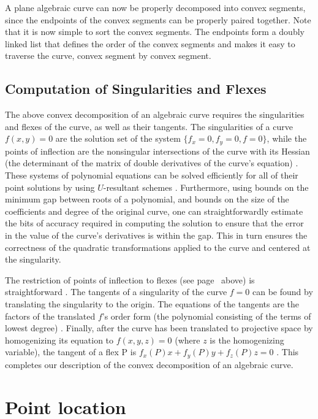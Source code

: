 A plane algebraic curve can now be properly decomposed into convex segments,
since the endpoints of the convex segments can be properly paired together.
Note that it is now simple to sort the convex segments.
The endpoints form a doubly linked list
that defines the order of the convex segments
and makes it easy to traverse the curve, convex segment by convex segment.

\subsection{Computation of Singularities and Flexes}
\label{ssc}

The above convex decomposition of an algebraic curve requires the singularities 
and flexes of the curve, as well as their tangents.
The singularities of a curve $f(x,y)=0$ are the solution set of the system
$\{f_{x}=0,f_{y}=0,f=0\}$, while the points of inflection are the nonsingular 
intersections of the curve with its Hessian (the determinant 
of the matrix of double derivatives of the curve's equation) \cite{walker}.
%
These systems of polynomial equations can be solved efficiently 
for all of their point solutions by using $U$-resultant schemes \cite[p. 74]{Ca}. 
Furthermore, using bounds on the minimum gap between roots of a polynomial, 
and bounds on the
size of the coefficients and degree of the original curve, one can straightforwardly
estimate the bits of accuracy required in computing the solution 
to ensure that the error in the value of the curve's derivatives is within the gap. 
This in turn ensures the correctness of the quadratic transformations applied to the 
curve and centered at the singularity.

The restriction of points of inflection to flexes (see page~\pageref{restriction} above)
is straightforward \cite[p. 44]{jj}.
The tangents of a singularity of the curve $f=0$ can be found by translating 
the singularity to the origin.
The equations of the tangents are the factors of the translated $f$'s order
form (the polynomial consisting of the terms of lowest degree) \cite{walker}.
Finally, after the curve has been translated to projective space by homogenizing 
its equation to $f(x,y,z)=0$ (where $z$ is the homogenizing variable),
the tangent of a flex P is $f_{x}(P)x + f_{y}(P)y + f_{z}(P)z= 0$ \cite{walker}.
This completes our description of the convex decomposition of an algebraic curve.

\section{Point location}
\label{s-loc}

